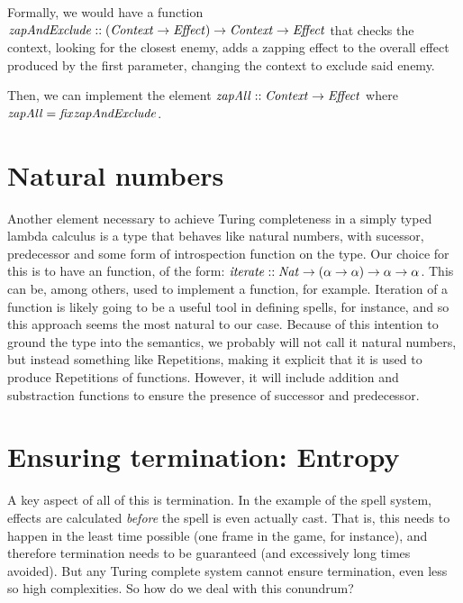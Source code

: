 \documentclass[12pt,a4paper]{article}
\begin{document}
Formally, we would have a function ${\it{zapAndExclude}} :: ({\it{Context}} \rightarrow {\it{Effect}}) \rightarrow {\it{Context}} \rightarrow {\it{Effect}}$ that checks the context, looking for the closest enemy, adds a zapping effect to the overall effect produced by the first parameter, changing the context to exclude said enemy.

Then, we can implement the element ${\it{zapAll}} :: {\it{Context}} \rightarrow {\it{Effect}}$ where ${\it{zapAll}} = {\it{fix}} {\it{zapAndExclude}}$.

\section{Natural numbers}
\label{natural_numbers}

Another element necessary to achieve Turing completeness in a simply typed lambda calculus is a type that behaves like natural numbers, with sucessor, predecessor and some form of introspection function on the type. Our choice for this is to have an  function, of the form: ${\it{iterate}} :: {\it{Nat}} \rightarrow (\alpha \rightarrow \alpha) \rightarrow \alpha \rightarrow \alpha$. This can be, among others, used to implement a  function, for example. Iteration of a function is likely going to be a useful tool in defining spells, for instance, and so this approach seems the most natural to our case. Because of this intention to ground the type into the semantics, we probably will not call it natural numbers, but instead something like Repetitions, making it explicit that it is used to produce Repetitions of functions. However, it will include addition and substraction functions to ensure the presence of successor and predecessor.

\section{Ensuring termination: Entropy}

A key aspect of all of this is termination. In the example of the spell system, effects are calculated {\emph{before}} the spell is even actually cast. That is, this needs to happen in the least time possible (one frame in the game, for instance), and therefore termination needs to be guaranteed (and excessively long times avoided). But any Turing complete system cannot ensure termination, even less so high complexities. So how do we deal with this conundrum?\\
\end{document}
